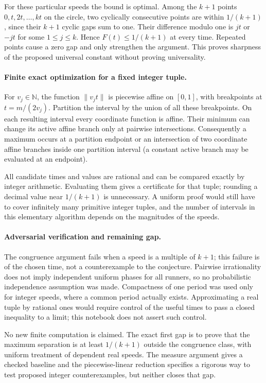 \documentclass[11pt,a4paper]{article}
\begin{document}
For these particular speeds the bound is optimal. Among the $k+1$ points $0,t,2t,\ldots,kt$ on the circle, two cyclically consecutive points are within $1/(k+1)$, since their $k+1$ cyclic gaps sum to one. Their difference modulo one is $jt$ or $-jt$ for some $1\le j\le k$. Hence $F(t)\le1/(k+1)$ at every time. Repeated points cause a zero gap and only strengthen the argument. This proves sharpness of the proposed universal constant without proving universality.

\paragraph{Finite exact optimization for a fixed integer tuple.}
For $v_j\in\mathbb N$, the function $\|v_jt\|$ is piecewise affine on $[0,1]$, with breakpoints at $t=m/(2v_j)$. Partition the interval by the union of all these breakpoints. On each resulting interval every coordinate function is affine. Their minimum can change its active affine branch only at pairwise intersections. Consequently a maximum occurs at a partition endpoint or an intersection of two coordinate affine branches inside one partition interval (a constant active branch may be evaluated at an endpoint).

All candidate times and values are rational and can be compared exactly by integer arithmetic. Evaluating them gives a certificate for that tuple; rounding a decimal value near $1/(k+1)$ is unnecessary. A uniform proof would still have to cover infinitely many primitive integer tuples, and the number of intervals in this elementary algorithm depends on the magnitudes of the speeds.

\paragraph{Adversarial verification and remaining gap.}
The congruence argument fails when a speed is a multiple of $k+1$; this failure is of the chosen time, not a counterexample to the conjecture. Pairwise irrationality does not imply independent uniform phases for all runners, so no probabilistic independence assumption was made. Compactness of one period was used only for integer speeds, where a common period actually exists. Approximating a real tuple by rational ones would require control of the useful times to pass a closed inequality to a limit; this notebook does not assert such control.

No new finite computation is claimed. The exact first gap is to prove that the maximum separation is at least $1/(k+1)$ outside the congruence class, with uniform treatment of dependent real speeds. The measure argument gives a checked baseline and the piecewise-linear reduction specifies a rigorous way to test proposed integer counterexamples, but neither closes that gap.
\end{document}
